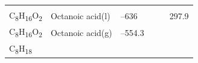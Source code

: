 \documentclass[
  9pt,
]{extbook}
\theoremstyle{definition}
\theoremstyle{definition}
\theoremstyle{definition}
\theoremstyle{remark}
\begin{document}
\begin{longtable}[]{@{}llllll@{}}
\begin{minipage}[t]{0.15\columnwidth}
\strut
\end{minipage} & \begin{minipage}[t]{0.14\columnwidth}\raggedright
\strut
\end{minipage} & \begin{minipage}[t]{0.14\columnwidth}\raggedright
\strut
\end{minipage}\tabularnewline
\begin{minipage}[t]{0.07\columnwidth}\raggedright
C\textsubscript{8}H\textsubscript{16}O\textsubscript{2}\strut
\end{minipage} & \begin{minipage}[t]{0.17\columnwidth}\raggedright
Octanoic acid(l)\strut
\end{minipage} & \begin{minipage}[t]{0.15\columnwidth}\raggedright
--636\strut
\end{minipage} & \begin{minipage}[t]{0.15\columnwidth}\raggedright
\strut
\end{minipage} & \begin{minipage}[t]{0.14\columnwidth}\raggedright
\strut
\end{minipage} & \begin{minipage}[t]{0.14\columnwidth}\raggedright
297.9\strut
\end{minipage}\tabularnewline
\begin{minipage}[t]{0.07\columnwidth}\raggedright
C\textsubscript{8}H\textsubscript{16}O\textsubscript{2}\strut
\end{minipage} & \begin{minipage}[t]{0.17\columnwidth}\raggedright
Octanoic acid(g)\strut
\end{minipage} & \begin{minipage}[t]{0.15\columnwidth}\raggedright
--554.3\strut
\end{minipage} & \begin{minipage}[t]{0.15\columnwidth}\raggedright
\strut
\end{minipage} & \begin{minipage}[t]{0.14\columnwidth}\raggedright
\strut
\end{minipage} & \begin{minipage}[t]{0.14\columnwidth}\raggedright
\strut
\end{minipage}\tabularnewline
\begin{minipage}[t]{0.07\columnwidth}\raggedright
C\textsubscript{8}H\textsubscript{18}\strut
\end{minipage} & \begin{minipage}[t]{0.17\columnwidth}\raggedright

\end{minipage}
\end{longtable}
\end{document}
